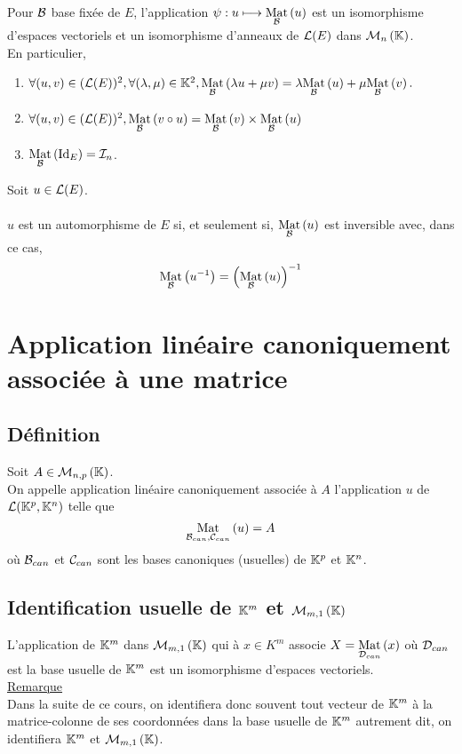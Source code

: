 \begin{prop}
    Pour \(\cal{B}\) base fixée de \(E\), l’application \(\psi : u \mapsto \Mat{\cal{B}}{u}\) est un isomorphisme d’espaces vectoriels et un isomorphisme d’anneaux de \(\cal{L}(E)\) dans \(\M{n}\).\\
    En particulier,
    \begin{enumerate}
        \item \(\forall(u, v) \in (\cal{L}(E))^2 , \forall(\lambda, \mu) \in \K^2, \Mat{\cal{B}}{\lambda u + \mu v} = \lambda \Mat{\cal{B}}{u} + \mu \Mat{\cal{B}}{v}.\)
        \item \( \forall(u, v) \in (\cal{L}(E))^2 , \Mat{\cal{B}}{v \circ u} = \Mat{\cal{B}}{v}\times \Mat{\cal{B}}{u} \)
        \item \(\Mat{\cal{B}}{\id{E}} = \cal{I}_n\).
    \end{enumerate}
\end{prop}

\begin{defprop}
    Soit \(u \in \cal{L}(E)\).\\~\\
    \(u\) est un automorphisme de \(E\) si, et seulement si, \(\Mat{\cal{B}}{u}\) est inversible avec, dans ce cas,
    \[\Mat{\cal{B}}{u^{-1}} =\paren{\Mat{\cal{B}}{u}}^{-1}\]
\end{defprop}

\section{Application linéaire canoniquement associée à une matrice}
\subsection{Définition}
\begin{defi}
    Soit \(A \in \M{n,p}\).\\
    On appelle application linéaire canoniquement associée à \(A\) l’application \(u\) de \(\cal{L}(\K^p, \K^n)\) telle que
    \[\Mat{\cal{B}_{can},\cal{C}_{can}}{u}= A\]
    où \(\cal{B}_{can}\) et \(\cal{C}_{can}\) sont les bases canoniques (\ie usuelles) de \(\K^p\) et \(\K^n\).
\end{defi}

\subsection{Identification usuelle de \(\K^m\) et \(\M{m,1}\)}
\begin{defprop}
    L’application de \(\K^m\) dans \(\M{m,1}\) qui à \(x \in K^m\) associe \(X = \Mat{\cal{D}_{can}}{x}\) où \(\cal{D}_{can}\) est la base usuelle de \(\K^m\) est un isomorphisme d’espaces vectoriels.\\
    \underline{Remarque} \\
    Dans la suite de ce cours, on identifiera donc souvent tout vecteur de \(\K^m\) à la matrice-colonne de ses coordonnées dans la base usuelle de \(\K^m\) autrement dit, on identifiera \(\K^m\) et \(\M{m,1}\).
\end{defprop}

